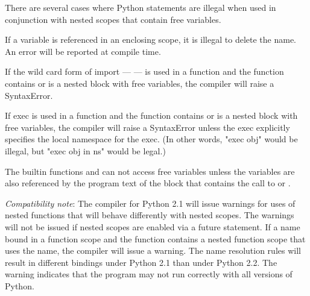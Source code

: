 There are several cases where Python statements are illegal when
used in conjunction with nested scopes that contain free
variables.

If a variable is referenced in an enclosing scope, it is illegal
to delete the name.  An error will be reported at compile time.

If the wild card form of import ---  --- is used in a
function and the function contains or is a nested block with free
variables, the compiler will raise a SyntaxError.

If exec is used in a function and the function contains or is a nested
block with free variables, the compiler will raise a SyntaxError
unless the exec explicitly specifies the local namespace for the exec.
(In other words, "exec obj" would be illegal, but "exec obj in ns"
would be legal.)

The builtin functions  and  can not
access free variables unless the variables are also referenced by the
program text of the block that contains the call to 
or .

\emph{Compatibility note}: The compiler for Python 2.1 will issue
warnings for uses of nested functions that will behave differently
with nested scopes.  The warnings will not be issued if nested scopes
are enabled via a future statement.  If a name bound in a function
scope and the function contains a nested function scope that uses the
name, the compiler will issue a warning.  The name resolution rules
will result in different bindings under Python 2.1 than under Python
2.2.  The warning indicates that the program may not run correctly
with all versions of Python.
